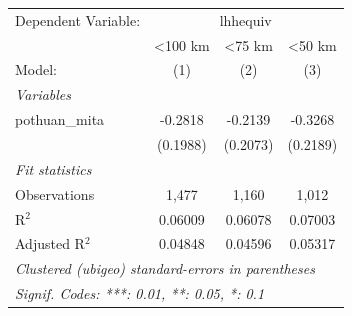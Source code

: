 
\begingroup
\centering
\begin{tabular}{lccc}
   \tabularnewline \midrule \midrule
   Dependent Variable: & \multicolumn{3}{c}{lhhequiv}\\
                  & <100 km  & <75 km   & <50 km \\   
   Model:         & (1)      & (2)      & (3)\\  
   \midrule
   \emph{Variables}\\
   pothuan\_mita  & -0.2818  & -0.2139  & -0.3268\\   
                  & (0.1988) & (0.2073) & (0.2189)\\   
   \midrule
   \emph{Fit statistics}\\
   Observations   & 1,477    & 1,160    & 1,012\\  
   R$^2$          & 0.06009  & 0.06078  & 0.07003\\  
   Adjusted R$^2$ & 0.04848  & 0.04596  & 0.05317\\  
   \midrule \midrule
   \multicolumn{4}{l}{\emph{Clustered (ubigeo) standard-errors in parentheses}}\\
   \multicolumn{4}{l}{\emph{Signif. Codes: ***: 0.01, **: 0.05, *: 0.1}}\\
\end{tabular}
\par\endgroup


